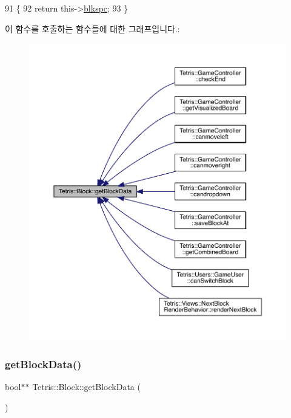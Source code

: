 \begin{DoxyCode}
91                           \{
92                 \textcolor{keywordflow}{return} this->\hyperlink{class_tetris_1_1_block_af2f96c83a3511d32321672f794aa4db1}{blkspc};
93             \}
\end{DoxyCode}
이 함수를 호출하는 함수들에 대한 그래프입니다.\+:
\nopagebreak
\begin{figure}[H]
\begin{center}
\leavevmode
\includegraphics[width=350pt]{df/d05/class_tetris_1_1_block_a9bd2c3d6ccacff9a5f56f72336ba324f_icgraph}
\end{center}
\end{figure}
\mbox{\label{class_tetris_1_1_block_a2e17230774c905e35aa9868986c49b09}} 
\subsubsection{\texorpdfstring{get\+Block\+Data()}{getBlockData()}\hspace{0.1cm}{\footnotesize\ttfamily [2/2]}}
{\footnotesize\ttfamily bool$\ast$$\ast$ Tetris\+::\+Block\+::get\+Block\+Data (\begin{DoxyParamCaption}{ }\end{DoxyParamCaption})\hspace{0.3cm}{\ttfamily [inline]}}

